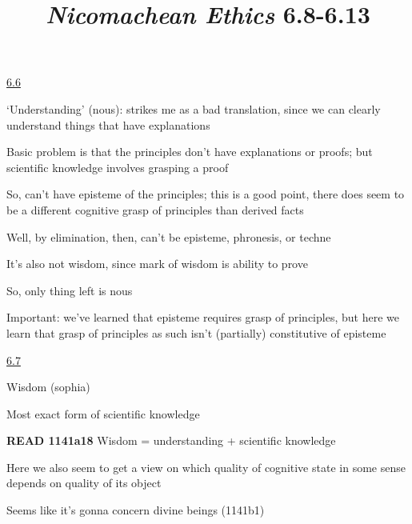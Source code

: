 \documentclass[11pt]{article}
\title{\emph{Nicomachean Ethics} 6.8-6.13}
\author{}
\date{}
\begin{document}
\maketitle

\noindent\underline{6.6}
\vspace*{4mm}

\noindent `Understanding' (nous): strikes me as a bad translation, since we can clearly understand things that have explanations
\vspace*{2mm}

\noindent Basic problem is that the principles don't have explanations or proofs; but scientific knowledge involves grasping a proof
\vspace*{2mm}

\noindent So, can't have episteme of the principles; this is a good point, there does seem to be a different cognitive grasp of principles than derived facts
\vspace*{2mm}

\noindent Well, by elimination, then, can't be episteme, phronesis, or techne
\vspace*{2mm}

\noindent It's also not wisdom, since mark of wisdom is ability to prove
\vspace*{2mm}

\noindent So, only thing left is nous
\vspace*{2mm}

\noindent Important: we've learned that episteme requires grasp of principles, but here we learn that grasp of principles as such isn't (partially) constitutive of episteme
\vspace*{2mm}

\noindent\underline{6.7}
\vspace*{4mm}

\noindent Wisdom (sophia)
\vspace*{2mm}

\noindent Most exact form of scientific knowledge
\vspace*{2mm}

\noindent\textbf{READ 1141a18} Wisdom = understanding + scientific knowledge
\vspace*{2mm}

\noindent Here we also seem to get a view on which quality of cognitive state in some sense depends on quality of its object
\vspace*{2mm}

\noindent Seems like it's gonna concern divine beings (1141b1)
\vspace*{2mm}
\end{document}
